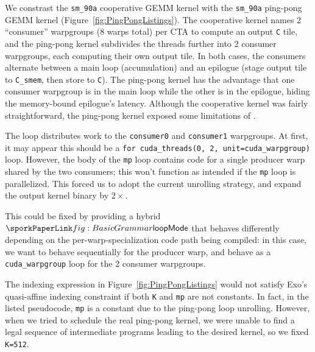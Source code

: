 
We constrast the \texttt{sm\_90a} cooperative GEMM kernel with the \texttt{sm\_90a} ping-pong GEMM kernel
(Figure~\ref{fig:PingPongListings}).
The cooperative kernel names 2 ``consumer'' warpgroups (8 warps total)
per CTA to compute an output \texttt{C} tile,
and the ping-pong kernel subdivides the threads further into 2 consumer warpgroups,
each computing their own output tile.
In both cases, the consumers alternate between a main loop (accumulation) and an epilogue
(stage output tile to \texttt{C\_smem}, then store to \texttt{C}).
The ping-pong kernel has the advantage that one consumer warpgroup is in the main loop
while the other is in the epilogue, hiding the memory-bound epilogue's latency.
Although the cooperative kernel was fairly straightforward,
the ping-pong kernel exposed some limitations of \sporkName{}.



The  loop distributes work to the
\texttt{consumer0} and \texttt{consumer1} warpgroups.
At first, it may appear this should be a
\texttt{for cuda\_threads(0, 2, unit=cuda\_warpgroup)} loop.
However, the body of the \texttt{mp} loop contains
code for a single producer warp shared by the two consumers;
this won't function as intended if the \texttt{mp} loop is parallelized.
This forced us to adopt the current unrolling strategy,
and expand the output kernel binary by $2\times$.

This could be fixed by providing a hybrid $\sporkloopMode$
that behaves differently depending on the per-warp-specialization code path being compiled:
in this case, we want  to behave sequentially
for the producer warp, and behave as a \texttt{cuda\_warpgroup} loop
for the 2 consumer warpgroups.

 The 
indexing expression in Figure~\ref{fig:PingPongListings} would not satisfy Exo's quasi-affine indexing constraint
if both \texttt{K} and \texttt{mp} are not constants.
In fact, in the listed pseudocode, \texttt{mp} is a constant due to the ping-pong loop unrolling.
However, when we tried to schedule the real ping-pong kernel,
we were unable to find a legal sequence of intermediate programs leading to the desired kernel,
so we fixed \texttt{K=512}.

